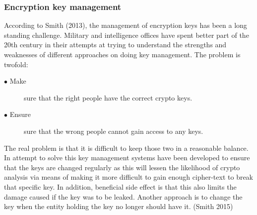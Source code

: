 \documentclass{article}
\begin{document}
\subsubsection{Encryption key management}
According to Smith (2013), the management of encryption keys has been a long standing challenge. Military and intelligence offices have spent better part of the 20th century in their attempts at trying to understand the strengths and weaknesses of different approaches on doing key management. The problem is twofold:
\begin{description}
	\item[$\bullet$ Make] sure that the right people have the correct crypto keys.
	\item[$\bullet$ Ensure] sure that the wrong people cannot gain access to any keys.
\end{description} 
The real problem is that it is difficult to keep those two in a reasonable balance. In attempt to solve this key management systems have been developed to ensure that the keys are changed regularly as this will lessen the likelihood of crypto analysis via means of making it more difficult to gain enough cipher-text to break that specific key. In addition, beneficial side effect is that this also limits the damage caused if the key was to be leaked. Another approach is to change the key when the entity holding the key no longer should have it. (Smith 2015) 
\end{document}
